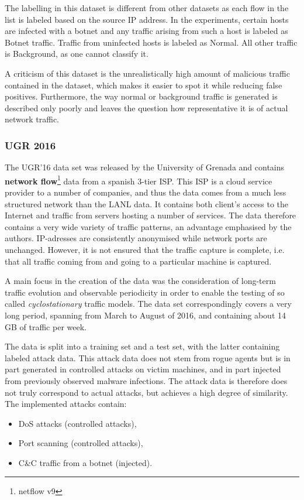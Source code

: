 \documentclass[a4paper,12pt,twoside]{report}
\begin{document}
The labelling in this dataset is different from other datasets as each  flow  in  the  list  is  labeled  based  on  the  source  IP  address.  In  the experiments,  certain  hosts  are  infected  with  a  botnet  and  any  traffic  arising from such a host is labeled as Botnet traffic. Traffic from uninfected hosts is labeled as Normal. All other traffic is Background, as one cannot classify it. 

A criticism of this dataset is the unrealistically high amount of malicious traffic contained in the dataset, which makes it easier to spot it while reducing false positives. Furthermore, the way normal or background traffic is generated is described only poorly and leaves the question how representative it is of actual network traffic.

\subsubsection*{UGR 2016 \cite{macia2018ugr}}

The UGR'16 data set was released by the University of Grenada and contains \textbf{network flow}\footnote{netflow v9} data from a spanish 3-tier ISP. This ISP is a cloud service provider to a number of companies, and thus the data comes from a much less structured network than the LANL data. It contains both client's access to the Internet and traffic from servers hosting a number of services. The data therefore contains a very wide variety of traffic patterns, an advantage emphasised by the authors. IP-adresses are consistently anonymised while network ports are unchanged. However, it is not ensured that the traffic capture is complete, i.e. that all traffic coming from and going to a particular machine is captured.

A main focus in the creation of the data was the consideration of long-term traffic evolution and observable periodicity in order to enable the testing of so called \textit{cyclostationary} traffic models. The data set correspondingly covers a very long period, spanning from March to August of 2016, and containing about 14 GB of traffic per week. 

The data is split into a training set and a test set, with the latter containing labeled attack data. This attack data does not stem from rogue agents but is in part generated in controlled attacks on victim machines, and in part injected from previously observed malware infections. The attack data is therefore does not truly correspond to actual attacks, but achieves a high degree of similarity. The implemented attacks contain:
\begin{itemize}
\item DoS attacks (controlled attacks),
\item Port scanning (controlled attacks),
\item C\&C traffic from a botnet (injected).
\end{itemize}
\end{document}
